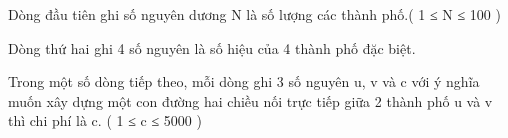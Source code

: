 Dòng đầu tiên ghi số nguyên dương N là số lượng các thành phố.( 1 ≤ N ≤ 100 )  

   Dòng thứ hai ghi 4 số nguyên là số hiệu của 4 thành phố đặc biệt.  

   Trong một số dòng tiếp theo, mỗi dòng ghi 3 số nguyên u, v và c với ý nghĩa muốn xây dựng một con đường hai chiều nối trực tiếp giữa 2 thành phố u và v thì chi phí là c.  ( 1 ≤ c ≤ 5000 )  

\
